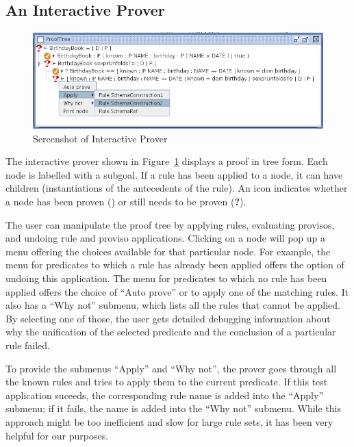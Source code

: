 \documentclass{entcs}
\begin{document}
\subsection{An Interactive Prover}

\begin{figure}[htbp]
  \centering
  \includegraphics[width=\textwidth]{cztprover1}
  \caption{Screenshot of Interactive Prover}
  \label{fig:cztprover}
\end{figure}

The interactive prover shown in Figure~\ref{fig:cztprover} displays a
proof in tree form.  Each node is labelled with a subgoal.  If a rule
has been applied to a node, it can have children (instantiations of
the antecedents of the rule).  An icon indicates whether a node has
been proven () or still needs to be proven ({\bf ?}).

The user can manipulate the proof tree by applying rules, evaluating
provisos, and undoing rule and proviso applications.  Clicking on a
node will pop up a menu offering the choices available for that
particular node.  For example, the menu for predicates to which a rule
has already been applied offers the option of undoing this
application.  The menu for predicates to which no rule has been
applied offers the choice of ``Auto prove'' or to apply one of the
matching rules.  It also has a ``Why not'' submenu, which lists all
the rules that cannot be applied.  By selecting one of those, the user
gets detailed debugging information about why the unification of the
selected predicate and the conclusion of a particular rule failed.

To provide the submenus ``Apply'' and ``Why not'', the prover goes
through all the known rules and tries to apply them to the current
predicate.  If this test application suceeds, the corresponding rule
name is added into the ``Apply'' submenu; if it fails, the name is
added into the ``Why not'' submenu.  While this approach might be too
inefficient and slow for large rule sets, it has been very helpful for
our purposes.
\end{document}
